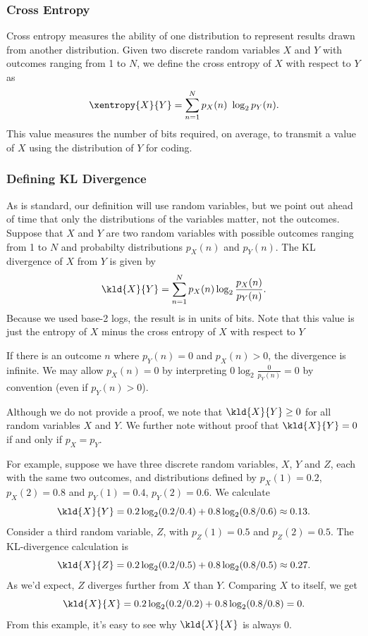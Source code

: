 \subsubsection{Cross Entropy}\label{section:stats-cross-entropy}

Cross entropy measures the ability of one distribution to represent
results drawn from another distribution.  Given two discrete random
variables $X$ and $Y$ with outcomes ranging from 1 to $N$, we define
the cross entropy of $X$ with respect to $Y$ as
%
\begin{equation}
\xentropy{X}{Y} = \sum_{n=1}^N p_X(n) \ \log_2 p_Y(n).
\end{equation}
%
This value measures the number of bits required, on average, to
transmit a value of $X$ using the distribution of $Y$ for coding.


\subsubsection{Defining KL Divergence}

As is standard, our definition will use random variables, but we point
out ahead of time that only the distributions of the variables matter,
not the outcomes.  Suppose that $X$ and $Y$ are two random variables
with possible outcomes ranging from 1 to $N$ and probabilty
distributions $p_X(n)$ and $p_Y(n)$.  The KL divergence of $X$ from
$Y$ is given by
%
\begin{equation}
\kld{X}{Y}
= \sum_{n=1}^N p_X(n) \log_2 \frac{p_X(n)}{p_Y(n)}.
\end{equation}
%
Because we used base-2 logs, the result is in units of bits.  Note
that this value is just the entropy of $X$ minus the cross entropy
of $X$ with respect to $Y$

If there is an outcome $n$ where $p_Y(n) = 0$ and $p_X(n) > 0$, the
divergence is infinite.  We may allow $p_X(n) = 0$ by interpreting $0
\log_2 \frac{0}{p_Y(n)} = 0$ by convention (even if $p_Y(n) > 0$).

Although we do not provide a proof, we note that $\kld{X}{Y} \geq 0$
for all random variables $X$ and $Y$.  We further note without proof
that $\kld{X}{Y} = 0$ if and only if $p_X = p_Y$.

For example, suppose we have three discrete random variables, $X$, $Y$
and $Z$, each with the same two outcomes, and distributions defined by
$p_X(1) = 0.2$, $p_X(2) = 0.8$ and $p_Y(1) = 0.4$, $p_Y(2) = 0.6$.  We
calculate 
%
\[
\kld{X}{Y} = 0.2 \log_2 (0.2/0.4) + 0.8 \log_2 (0.8/0.6) \approx 0.13.
\]
%
Consider a third random variable, $Z$, with $p_Z(1) = 0.5$ and
$p_Z(2) = 0.5$.  The KL-divergence calculation is 
%
\[
\kld{X}{Z} = 0.2 \log_2 (0.2/0.5) + 0.8 \log_2 (0.8/0.5) \approx 0.27.
\]
As we'd expect, $Z$ diverges further from $X$ than $Y$.  
Comparing $X$ to itself, we get
%
\[
\kld{X}{X} = 0.2 \log_2 (0.2/0.2) + 0.8 \log_2(0.8/0.8) = 0.
\]  
%
From this example, it's easy to see why $\kld{X}{X}$ is always 0.

